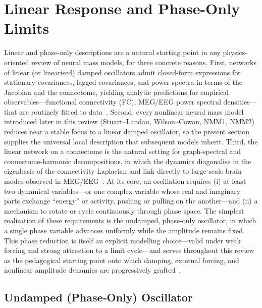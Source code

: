 \documentclass[12pt]{article}
\numberwithin{equation}{section}
\newcommand{\rev}[1]{\begingroup\color{blue}#1\endgroup}
\begin{document}
\section{Linear Response and Phase-Only Limits}
\label{sec:linear-phase}
\rev{Linear and phase-only descriptions are a natural starting point in any physics-oriented review of neural mass models, for three concrete reasons. First, networks of linear (or linearised) damped oscillators admit closed-form expressions for stationary covariances, lagged covariances, and power spectra in terms of the Jacobian and the connectome, yielding analytic predictions for empirical observables---functional connectivity (FC), MEG/EEG power spectral densities---that are routinely fitted to data~\cite{PonceAlvarez2024HopfLinear,Gilson2016}. Second, every nonlinear neural mass model introduced later in this review (Stuart--Landau, Wilson--Cowan, NMM1, NMM2) reduces near a stable focus to a linear damped oscillator, so the present section supplies the universal local description that subsequent models inherit. Third, the linear network on a connectome is the natural setting for graph-spectral and connectome-harmonic decompositions, in which the dynamics diagonalise in the eigenbasis of the connectivity Laplacian and link directly to large-scale brain modes observed in MEG/EEG~\cite{atasoyConnectomeharmonicDecompositionHuman2017a}. At its core, an oscillation requires (i) at least two dynamical variables---or one complex variable whose real and imaginary parts exchange ``energy'' or activity, pushing or pulling on the another---and (ii) a mechanism to rotate or cycle continuously through phase space. The simplest realisation of these requirements is the undamped, phase-only oscillator, in which a single phase variable advances uniformly while the amplitude remains fixed. This phase reduction is itself an explicit modelling choice---valid under weak forcing and strong attraction to a limit cycle---and serves throughout this review as the pedagogical starting point onto which damping, external forcing, and nonlinear amplitude dynamics are progressively grafted~\cite{Strogatz2018,Winfree2001}.}


\subsection{Undamped (Phase‐Only) Oscillator}
\end{document}

